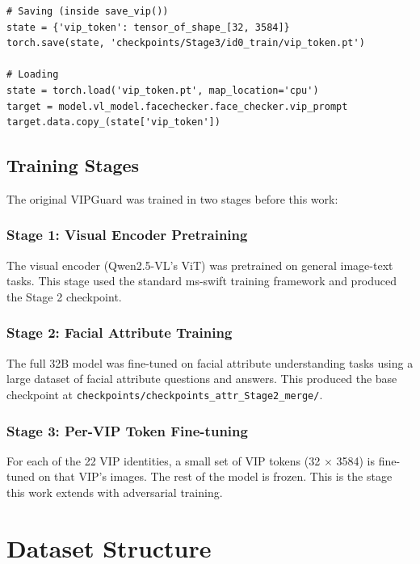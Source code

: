 \documentclass[12pt,a4paper]{article}
\begin{document}
\begin{lstlisting}[caption={How VIP tokens are saved and loaded}]
# Saving (inside save_vip())
state = {'vip_token': tensor_of_shape_[32, 3584]}
torch.save(state, 'checkpoints/Stage3/id0_train/vip_token.pt')

# Loading
state = torch.load('vip_token.pt', map_location='cpu')
target = model.vl_model.facechecker.face_checker.vip_prompt
target.data.copy_(state['vip_token'])
\end{lstlisting}

\subsection{Training Stages}

The original VIPGuard was trained in two stages before this work:

\subsubsection{Stage 1: Visual Encoder Pretraining}
The visual encoder (Qwen2.5-VL's ViT) was pretrained on general image-text tasks. This stage used the standard ms-swift training framework and produced the Stage 2 checkpoint.

\subsubsection{Stage 2: Facial Attribute Training}
The full 32B model was fine-tuned on facial attribute understanding tasks using a large dataset of facial attribute questions and answers. This produced the base checkpoint at \texttt{checkpoints/checkpoints\_attr\_Stage2\_merge/}.

\subsubsection{Stage 3: Per-VIP Token Fine-tuning}
For each of the 22 VIP identities, a small set of VIP tokens (32 $\times$ 3584) is fine-tuned on that VIP's images. The rest of the model is frozen. This is the stage this work extends with adversarial training.

\section{Dataset Structure}
\end{document}
